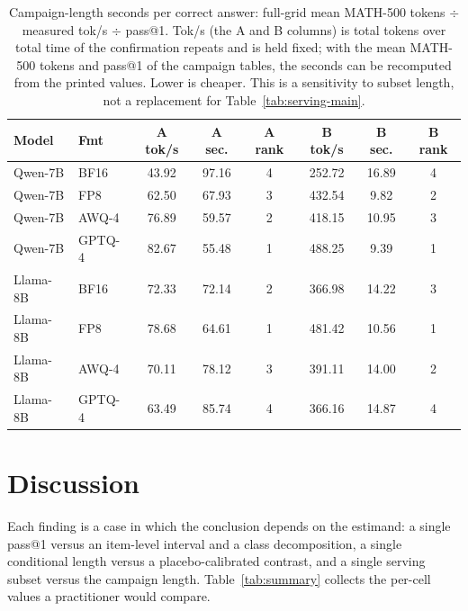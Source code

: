 \documentclass[11pt,a4paper]{article}
\begin{document}
\begin{table}[t]
\centering
\caption{Campaign-length seconds per correct answer: full-grid mean MATH-500 tokens $\div$ measured tok/s $\div$ pass@1. Tok/s (the A and B columns) is total tokens over total time of the confirmation repeats and is held fixed; with the mean MATH-500 tokens and pass@1 of the campaign tables, the seconds can be recomputed from the printed values. Lower is cheaper. This is a sensitivity to subset length, not a replacement for Table~\ref{tab:serving-main}.}
\label{tab:length-cost}
\small
\begin{tabular}{llcccccc}
\toprule
\textbf{Model} & \textbf{Fmt} & \textbf{A tok/s} & \textbf{A sec.} & \textbf{A rank} & \textbf{B tok/s} & \textbf{B sec.} & \textbf{B rank} \\
\midrule
Qwen-7B & BF16 & 43.92 & 97.16 & 4 & 252.72 & 16.89 & 4 \\
Qwen-7B & FP8 & 62.50 & 67.93 & 3 & 432.54 & 9.82 & 2 \\
Qwen-7B & AWQ-4 & 76.89 & 59.57 & 2 & 418.15 & 10.95 & 3 \\
Qwen-7B & GPTQ-4 & 82.67 & 55.48 & 1 & 488.25 & 9.39 & 1 \\
Llama-8B & BF16 & 72.33 & 72.14 & 2 & 366.98 & 14.22 & 3 \\
Llama-8B & FP8 & 78.68 & 64.61 & 1 & 481.42 & 10.56 & 1 \\
Llama-8B & AWQ-4 & 70.11 & 78.12 & 3 & 391.11 & 14.00 & 2 \\
Llama-8B & GPTQ-4 & 63.49 & 85.74 & 4 & 366.16 & 14.87 & 4 \\
\bottomrule
\end{tabular}
\end{table}

\FloatBarrier

\section{Discussion}
Each finding is a case in which the conclusion depends on the estimand: a single pass@1 versus an item-level interval and a class decomposition, a single conditional length versus a placebo-calibrated contrast, and a single serving subset versus the campaign length. Table~\ref{tab:summary} collects the per-cell values a practitioner would compare.
\end{document}
